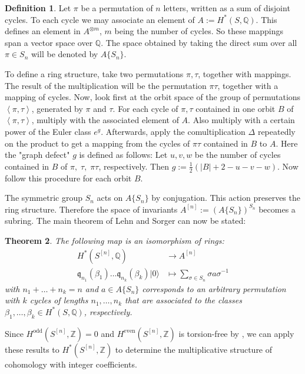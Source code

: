 \documentclass{amsart}
\newcommand{\hilb}[1]{^{[#1]}}
\newcommand{\vac}{|0\rangle}
\newcommand{\IQ}{\mathbb{Q}}
\newcommand{\IZ}{\mathbb{Z}}
\newcommand{\kq}{\mathfrak{q}}
\theoremstyle{plain}
\newtheorem{theorem}{Theorem}[section]
\theoremstyle{definition}
\newtheorem{definition}[theorem]{Definition}
\theoremstyle{remark}
\begin{document}
\begin{definition} \cite[Sect. 2]{LehnSorger}
Let $\pi$ be a permutation of $n$ letters, written as a sum of disjoint cycles. To each cycle we may associate an element of $A:=H^\ast(S,\IQ)$. This defines an element in $A^{\otimes m}$, $m$ being the number of cycles. So these mappings span a vector space over $\IQ$. The space obtained by taking the direct sum over all $\pi \in S_n$ will be denoted by $A\{S_n\}$. 

To define a ring structure, take two permutations $\pi,\tau$, together with mappings. The result of the multiplication will be the permutation $\pi\tau$, together with a mapping of cycles. Now, look first at the orbit space of the group of permutations $\left<\pi,\tau\right>$, generated by $\pi$ and $\tau$. For each cycle of $\pi, \tau$ contained in one orbit $B$ of $\left<\pi,\tau\right>$, multiply with the associated element of $A$. Also multiply with a certain power of the Euler class $e^g$. 
Afterwards, apply the comultiplication $\Delta$ repeatedly on the product to get a mapping from the cycles of $\pi\tau$ contained in $B$ to $A$. 
Here the "graph defect" $g$ is defined as follows: Let $u,v,w$ be the number of cycles contained in $B$ of $\pi,\;\tau,\;\pi\tau$, respectively. Then $g:=\frac{1}{2}\left(|B| + 2- u-v-w\right)$. Now follow this procedure for each orbit $B$. 

\end{definition}
The symmetric group $S_n$ acts on $A\{S_n\}$ by conjugation. This action preserves the ring structure. Therefore the space of invariants $A\hilb{n} := \left(A\{S_n\} \right)^{S_n}$ becomes a subring. The main theorem of Lehn and Sorger can now be stated:
\begin{theorem} \cite[Thm. 3.2.]{LehnSorger}
The following map is an isomorphism of rings:
\begin{align*}
H^\ast(S\hilb{n},\IQ) & \longrightarrow A\hilb{n} \\
\kq_{n_1}(\beta_1)\ldots \kq_{n_k}(\beta_k) \vac &\longmapsto \sum_{\sigma\in S_n} \sigma a \sigma^{{-}1} 
\end{align*}
with $n_1+\ldots + n_k =n$ and $a\in A\{S_n\} $ corresponds to an arbitrary permutation with $k$ cycles of lengths $n_1,\ldots,n_k$ that are associated to the classes $\beta_1,\ldots,\beta_k \in H^\ast(S,\IQ)$, respectively.
\end{theorem}

Since $H^\text{odd}(S\hilb{n},\IZ) = 0$ and $H^\text{even}(S\hilb{n},\IZ)$ is torsion-free by \cite{Markman}, we can apply these results to $H^\ast(S\hilb{n}, \IZ)$ to determine the multiplicative structure of cohomology with integer coefficients.
\end{document}
